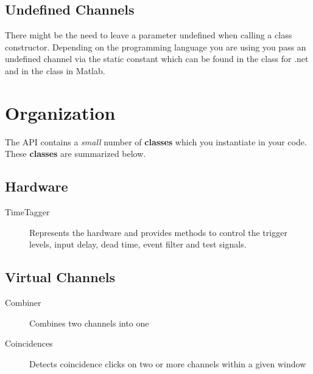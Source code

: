 \documentclass[letterpaper,10pt,english]{sphinxmanual}
\begin{document}
\subsection{Undefined Channels}
\label{sections/api:undefined-channels}
There might be the need to leave a parameter undefined when calling a class constructor.
Depending on the programming language you are using you pass an undefined channel via the
static constant  which can be found in the  class for .net and
in the  class in Matlab.


\section{Organization}
\label{sections/api:organization}
The API contains a \emph{small} number of \textbf{classes} which you instantiate in your code.
These \textbf{classes} are summarized below.


\subsection{Hardware}
\label{sections/api:hardware}\begin{description}
\item[{TimeTagger}] \leavevmode
Represents the hardware and provides methods to control the trigger levels, input delay, dead time, event filter and test signals.

\end{description}


\subsection{Virtual Channels}
\label{sections/api:virtual-channels}\begin{description}
\item[{Combiner}] \leavevmode
Combines two channels into one

\item[{Coincidences}] \leavevmode
Detects coincidence clicks on two or more channels within a given window

\end{description}
\end{document}

